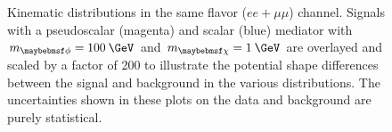 \begin{figure}[h!]
  \caption{Kinematic distributions in the same flavor ($ee+\mu\mu$) channel. Signals with a pseudoscalar (magenta) and scalar (blue) mediator with $\mMed=100\:\GeV$ and $\mDM=1\:\GeV$ are overlayed and scaled by a factor of 200 to illustrate the potential shape differences between the signal and background in the various distributions. The uncertainties shown in these plots on the data and background are purely statistical.}
  \label{fig:dilep_sr_sf}
\end{figure}

\begin{figure}[h!]
  \centering
   \\
   \\

\end{figure}
